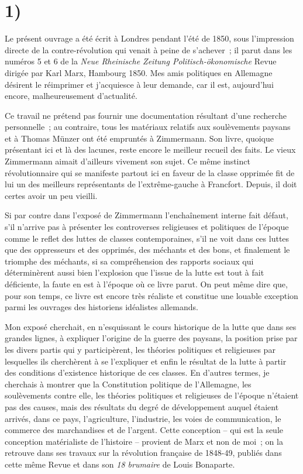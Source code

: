 \documentclass[french,twoside]{book} %
\begin{document}
\section[{1)}]{1)}
\noindent Le présent ouvrage a été écrit à Londres pendant l’été de 1850, sous l’impression directe de la contre-révolution qui venait à peine de s’achever ; il parut dans les numéros 5 et 6 de la \emph{Neue Rheinische Zeitung Politisch-ökonomische} Revue dirigée par Karl Marx, Hambourg 1850. Mes amis politiques en Allemagne désirent le réimprimer et j’acquiesce à leur demande, car il est, aujourd’hui encore, malheureusement d’actualité.\par
Ce travail ne prétend pas fournir une documentation résultant d’une recherche personnelle ; au contraire, tous les matériaux relatifs aux soulèvements paysans et à Thomas Münzer ont été empruntés à Zimmermann. Son livre, quoique présentant ici et là des lacunes, reste encore le meilleur recueil des faits. Le vieux Zimmermann aimait d’ailleurs vivement son sujet. Ce même instinct révolutionnaire qui se manifeste partout ici en faveur de la classe opprimée fit de lui un des meilleurs représentants de l’extrême-gauche à Francfort. Depuis, il doit certes avoir un peu vieilli.\par
Si par contre dans l’exposé de Zimmermann l’enchaînement interne fait défaut, s’il n’arrive pas à présenter les controverses religieuses et politiques de l’époque comme le reflet des luttes de classes contemporaines, s’il ne voit dans ces luttes que des oppresseurs et des opprimés, des méchants et des bons, et finalement le triomphe des méchants, si sa compréhension des rapports sociaux qui déterminèrent aussi bien l’explosion que l’issue de la lutte est tout à fait déficiente, la faute en est à l’époque où ce livre parut. On peut même dire que, pour son temps, ce livre est encore très réaliste et constitue une louable exception parmi les ouvrages des historiens idéalistes allemands.\par
Mon exposé cherchait, en n’esquissant le cours historique de la lutte que dans ses grandes lignes, à expliquer l’origine de la guerre des paysans, la position prise par les divers partis qui y participèrent, les théories politiques et religieuses par lesquelles ils cherchèrent à se l’expliquer et enfin le résultat de la lutte à partir des conditions d’existence historique de ces classes. En d’autres termes, je cherchais à montrer que la Constitution politique de l’Allemagne, les soulèvements contre elle, les théories politiques et religieuses de l’époque n’étaient pas des causes, mais des résultats du degré de développement auquel étaient arrivés, dans ce pays, l’agriculture, l’industrie, les voies de communication, le commerce des marchandises et de l’argent. Cette conception – qui est la seule conception matérialiste de l’histoire – provient de Marx et non de moi ; on la retrouve dans ses travaux sur la révolution française de 1848-49, publiés dans cette même Revue et dans son \emph{18 brumaire} de Louis Bonaparte.\par
\end{document}

